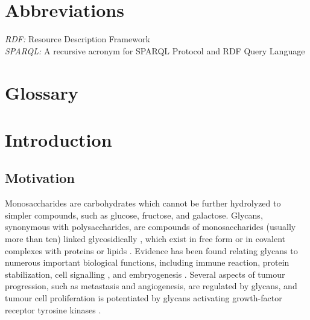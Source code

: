 \documentclass[12pt,a4paper]{article}
\begin{document}
\section*{Abbreviations}
\doublespacing
\textit{RDF:} Resource Description Framework\\
\textit{SPARQL:} A recursive acronym for SPARQL Protocol and RDF Query Language\\

\newpage
\section*{Glossary}
\label{sec:glossary}
\doublespacing













\newpage
\section{Introduction}
\label{sec:intro}


\subsection{Motivation}
\label{sec:glycan_function}
Monosaccharides are carbohydrates which cannot be further hydrolyzed to simpler compounds, such as glucose, fructose, and galactose. Glycans, synonymous with polysaccharides, are compounds of monosaccharides (usually more than ten) linked glycosidically \citep{mcnaught1997compendium}, which exist in free form or in covalent complexes with proteins or lipids \citep{doi:10.1093/bioinformatics/btm090}. Evidence has been found relating glycans to numerous important biological functions, including immune reaction, protein stabilization, cell signalling \citep{bucior2004carbohydrate}, and embryogenesis \citep{rosa2002functional}. Several aspects of tumour progression, such as metastasis and angiogenesis, are regulated by glycans, and tumour cell proliferation is potentiated by glycans activating growth-factor receptor tyrosine kinases \citep{fuster2005sweet}.
\end{document}
